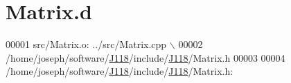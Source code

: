 \hypertarget{_matrix_8d_source}{}\section{Matrix.\+d}
\label{_matrix_8d_source}

\begin{DoxyCode}
00001 src/Matrix.o: ../src/Matrix.cpp \(\backslash\)
00002  /home/joseph/software/\hyperlink{namespace_j118}{J118}/include/\hyperlink{namespace_j118}{J118}/Matrix.h
00003 
00004 /home/joseph/software/\hyperlink{namespace_j118}{J118}/include/\hyperlink{namespace_j118}{J118}/Matrix.h:
\end{DoxyCode}
